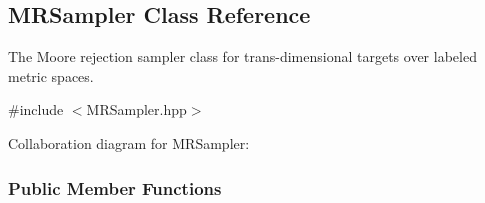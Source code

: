 \hypertarget{classMRSampler}{\subsection{\-M\-R\-Sampler \-Class \-Reference}
\label{classMRSampler}
}


\-The \-Moore rejection sampler class for trans-\/dimensional targets over labeled metric spaces.  




{\ttfamily \#include $<$\-M\-R\-Sampler.\-hpp$>$}



\-Collaboration diagram for \-M\-R\-Sampler\-:
\subsubsection*{\-Public \-Member \-Functions}
